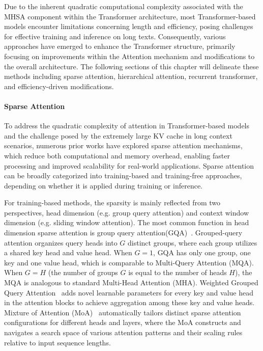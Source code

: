 \documentclass[11pt, a4paper, logo, copyright, nonumbering]{map}
\begin{document}
Due to the inherent quadratic computational complexity associated with the MHSA component within the Transformer architecture, most Transformer-based models encounter limitations concerning length and efficiency, posing challenges for effective training and inference on long texts. Consequently, various approaches have emerged to enhance the Transformer structure, primarily focusing on improvements within the Attention mechanism and modifications to the overall architecture. The following sections of this chapter will delineate these methods including sparse attention, hierarchical attention, recurrent transformer, and efficiency-driven modifications.


\paragraph{Sparse Attention}
To address the quadratic complexity of attention in Transformer-based models and the challenge posed by the extremely large KV cache in long context scenarios, numerous prior works have explored sparse attention mechanisms, which reduce both computational and memory overhead, enabling faster processing and improved scalability for real-world applications. Sparse attention can be broadly categorized into training-based and training-free approaches, depending on whether it is applied during training or inference.


For training-based methods, the sparsity is mainly reflected from two perspectives,  head dimension (e.g. group query attention) and context window dimension (e.g. sliding window attention).
The most common function in head dimension sparse attention is group query attention(GQA)~\citep{ainslie2023gqatraininggeneralizedmultiquery}. 
Grouped-query attention organizes query heads into $G$ distinct groups, where each group utilizes a shared key head and value head. When $G=1$, GQA has only one group, one key and one value head, which is comparable to Multi-Query Attention (MQA).
When $G=H$ (the number of groups $G$ is equal to the number of heads $H$), the MQA is analogous to standard Multi-Head Attention (MHA). 
Weighted Grouped Query Attention~\citep{chinnakonduru2024weightedgroupedqueryattention} adds novel learnable parameters for every key and value head in the attention blocks to achieve aggregation among these key and value heads. Mixture of Attention (MoA)~\cite{fu2024moamixturesparseattention} automatically tailors distinct sparse attention configurations for different heads and layers, where the MoA constructs and navigates a search space of various attention patterns and their scaling rules relative to input sequence lengths.
\end{document}
